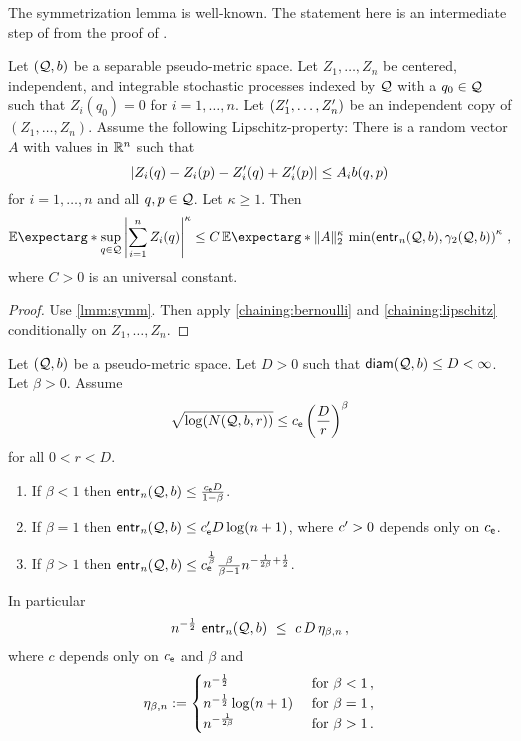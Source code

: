 %
The symmetrization lemma is well-known. The statement here is an intermediate step of from the proof of \cite[2.3.6 Lemma]{vaart96}.
%
\begin{theorem}\label{chaining:empproc}
	Let $(\mathcal{Q}, b)$ be a separable pseudo-metric space. Let $Z_1, \dots, Z_n$ be centered, independent, and integrable stochastic processes indexed by $\mathcal{Q}$ with a $q_0 \in \mathcal{Q}$ such that $Z_i(q_0) = 0$ for $i=1,\dots, n$.
	Let $(Z_1^\prime, \dots, Z_n^\prime)$ be an independent copy of $(Z_1, \dots, Z_n)$.
	Assume the following Lipschitz-property: There is a random vector $A$ with values in $\mathbb{R}^n$ such that
	\begin{equation*}
		\left| Z_i(q)-Z_i(p)-Z_i^\prime(q)+ Z_i^\prime(p) \right| \leq A_i b(q,p)
	\end{equation*} 
	for $i = 1,\dots, n$ and all $q,p\in\mathcal{Q}$.
	Let $\kappa \geq 1$.
	Then
	\begin{equation*}
		\Ex*{\sup_{q\in\mc Q} \abs{\sum_{i=1}^nZ_i(q)}^\kappa} \leq C\, \Ex*{\normof{A}_2^\kappa} \, 
		\min\brOf{\entrn(\mc Q, b), \gamma_2(\mc Q, b)}^\kappa
		\eqcm
	\end{equation*}
	where $C > 0$ is an universal constant.
\end{theorem}
%
\begin{proof}
	Use \autoref{lmm:symm}. Then apply \autoref{chaining:bernoulli} and \autoref{chaining:lipschitz} conditionally on $Z_1, \dots, Z_n$.
\end{proof}
%
\begin{lemma}\label{lmm:chaining:rate}
Let $(\mathcal{Q}, b)$ be a pseudo-metric space.
Let $D >0 $ such that $\operatorname{\mathsf{diam}}(\mathcal{Q}, b) \leq D < \infty$.
Let $\beta > 0$. Assume 
\begin{equation*}
	\sqrt{\log(N(\mathcal{Q}, b , r))} \leq c_{\mathsf{e}} \left( \frac{D}{r} \right)^\beta
\end{equation*}
for all $0 < r < D$.
\begin{enumerate}[label=\environmentEnumerateLabel]
	\item If $\beta < 1$ then $\operatorname{\mathsf{entr}_\mathit{n}}(\mathcal{Q}, b) \leq \frac{c_{\mathsf{e}}D}{1-\beta}$.
	\item If $\beta = 1$ then $\operatorname{\mathsf{entr}_\mathit{n}}(\mathcal{Q}, b) \leq c_{\mathsf{e}}^\prime D \log(n+1)$, where $c^\prime>0$ depends only on $c_{\mathsf{e}}$.
	\item If $\beta > 1$ then $\operatorname{\mathsf{entr}_\mathit{n}}(\mathcal{Q}, b) \leq c_{\mathsf{e}}^{\frac1\beta} \frac\beta{\beta-1} n^{-\frac1{2\beta}+\frac12}$.
\end{enumerate}
In particular
\begin{equation*}
	n^{-\frac12} \,\operatorname{\mathsf{entr}_\mathit{n}}(\mathcal{Q}, b) \ \leq\  c \, D\, \eta_{\beta,n} \, ,
\end{equation*}
where $c$ depends only on $c_{\mathsf{e}}$ and $\beta$ and
\begin{equation*}
	\eta_{\beta,n} := 
	\begin{cases} 
		n^{-\frac12} & \text{ for }\beta < 1\, ,\\
		n^{-\frac12} \log(n+1) & \text{ for } \beta = 1\, ,\\
		n^{-\frac1{2\beta}} & \text{ for } \beta > 1\, .
	\end{cases} 
\end{equation*}
\end{lemma}
